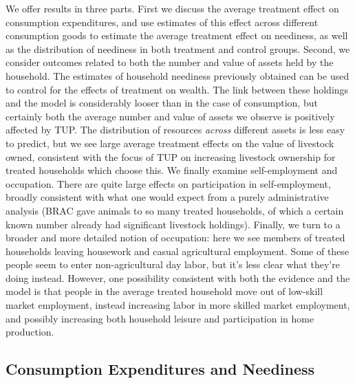 \documentclass[12pt,letterpaper]{article}
\begin{document}
We offer results in three parts.  First we discuss the average
treatment effect on consumption expenditures, and use estimates of
this effect across different consumption goods to estimate the average
treatment effect on neediness, as well as the distribution of
neediness in both treatment and control groups.  Second, we consider
outcomes related to both the number and value of assets held by the
household.  The estimates of household neediness previously obtained
can be used to control for the effects of treatment on wealth.  The
link between these holdings and the model is considerably looser than
in the case of consumption, but certainly both the average number and
value of assets we observe is positively affected by TUP.  The
distribution of resources \emph{across} different assets is less easy to
predict, but we see large average treatment effects on the value of
livestock owned, consistent with the focus of TUP on increasing
livestock ownership for treated households which choose this.  We
finally examine self-employment and occupation.  There are quite large
effects on participation in self-employment, broadly consistent with
what one would expect from a purely administrative analysis (BRAC gave
animals to so many treated households, of which a certain known number
already had significant livestock holdings).  Finally, we turn to a
broader and more detailed notion of occupation: here we see members of
treated households leaving housework and casual agricultural
employment.  Some of these people seem to enter non-agricultural day
labor, but it's less clear what they're doing instead.  However, one
possibility consistent with both the evidence and the model is that
people in the average treated household move out of low-skill market
employment, instead increasing labor in more skilled market
employment, and possibly increasing both household leisure and
participation in home production.



\subsection{Consumption Expenditures and Neediness}
\label{sec:orgheadline13}
\end{document}
